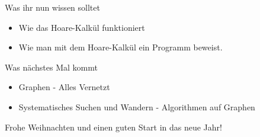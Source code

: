 \begin{frame}	
	\begin{block}{Was ihr nun wissen solltet}
		\begin{itemize}
			\item Wie das Hoare-Kalkül funktioniert
			\item Wie man mit dem Hoare-Kalkül ein Programm beweist.
		\end{itemize}
	\end{block}
	
	\begin{block}{Was nächstes Mal kommt}
		\begin{itemize}
			\item Graphen - Alles Vernetzt
			\item Systematisches Suchen und Wandern - Algorithmen auf Graphen
		\end{itemize}
	\end{block}
\end{frame}

\begin{frame}
	\Large
	\centering
	Frohe Weihnachten und einen guten Start in das neue Jahr!
\end{frame}

\slideThanks

